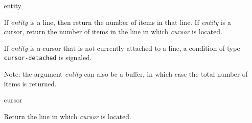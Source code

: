  {entity}

If \textit{entity} is a line, then return the number of items in that
line.  If \textit{entity} is a cursor, return the number of items in
the line in which \textit{cursor} is located.

If \textit{entity} is a cursor that is not currently attached to a
line, a condition of type \texttt{cursor-detached} is signaled.

Note: the argument \textit{entity} can also be a buffer, in which case
the total number of items is returned.

 {cursor}

Return the line in which \textit{cursor} is located. 

\ifdetached{}
